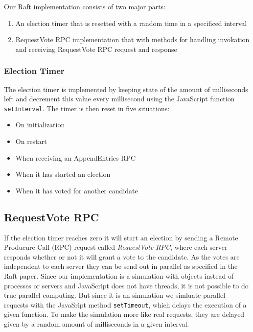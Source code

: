 Our Raft implementation consists of two major parts:

\begin{enumerate}
  \item An election timer that is resetted with a random time in a specificed interval
  \item RequestVote RPC implementation that with methods for handling invokation and receiving RequestVote RPC request and response
\end{enumerate}

\subsubsection{Election Timer} %
\label{ssub:election_timer}

The election timer is implemented by keeping state of the amount of milliseconds left and decrement this value every millisecond using the JavaScript function \verb$setInterval$. The timer is then reset in five situations:

\begin{itemize}
  \item On initialization
  \item On restart
  \item When receiving an AppendEntries RPC
  \item When it has started an election
  \item When it has voted for another candidate
\end{itemize}


\subsection{RequestVote RPC} %
\label{sub:requestvote_rpc}

If the election timer reaches zero it will start an election by sending a Remote Producure Call (RPC) request called \emph{RequestVote RPC}, where each server responds whether or not it will grant a vote to the candidate. As the votes are independent to each server they can be send out in parallel as specified in the Raft paper. Since our implementation is a simulation with objects instead of processes or servers and JavaScript does not have threads, it is not possible to do true parallel computing. But since it is an simulation we simluate parallel requests with the JavaSript method \verb$setTimeout$, which delays the execution of a given function. To make the simulation more like real requests, they are delayed given by a random amount of milliseconds in a given interval.

